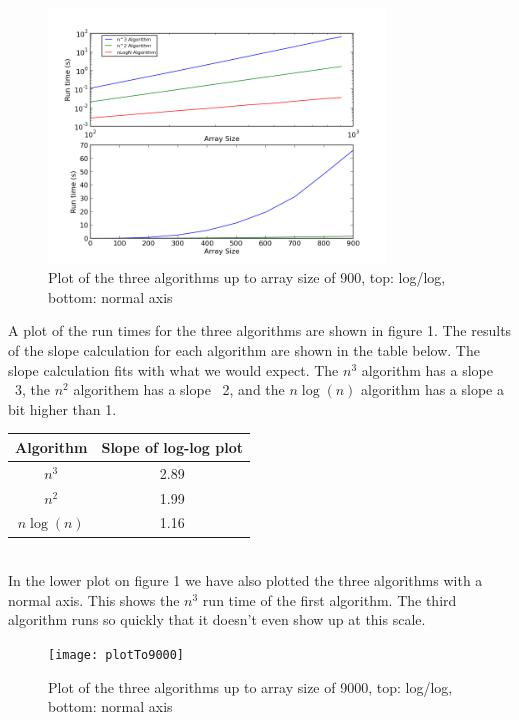 \documentclass[a4paper,12pt]{article}
\begin{document}
\begin{figure}[h!]
\centering
\includegraphics[width=0.8\textwidth]{plotTo900}
\caption{Plot of the three algorithms up to array size of 900, top: log/log, bottom: normal axis}
\end{figure} 

A plot of the run times for the three algorithms are shown in figure 1.  The results of the slope calculation for each algorithm are shown in the table below.  The slope calculation fits with what we would expect.  The $n^3$ algorithm has a slope ~3, the $n^2$ algorithem has a slope ~2, and the $n\log(n)$ algorithm has a slope a bit higher than 1. \\

\begin{tabular}{|c|c|}
\hline 
Algorithm & Slope of log-log plot \\ 
\hline 
$n^3$ & 2.89 \\ 
\hline 
$n^2$ & 1.99 \\ 
\hline 
$n\log(n)$ & 1.16 \\ 
\hline 
\end{tabular}\\

In the lower plot on figure 1 we have also plotted the three algorithms with a normal axis.  This shows the $n^3$ run time of the first algorithm.  The third algorithm runs so quickly that it doesn't even show up at this scale. 

\begin{figure}[h!]
\centering
\texttt{[image: plotTo9000]}
\caption{Plot of the three algorithms up to array size of 9000, top: log/log, bottom: normal axis}
\end{figure} 

\pagebreak
 
\end{document}
